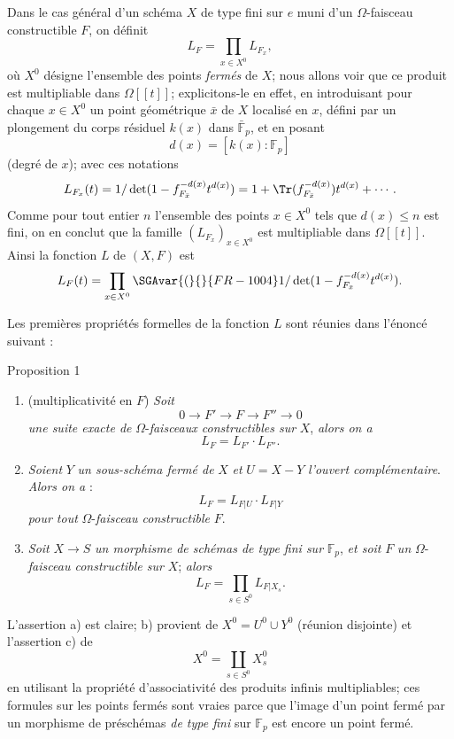 Dans le cas
général d'un schéma $X$ de type fini sur $e$ muni d'un $\Omega$-faisceau constructible $F$, on définit
\[
L_F=\prod_{x\in X^0}L_{F_x},
\]
où $X^0$ désigne l'ensemble des points \emph{fermés} de $X$; nous allons voir que ce produit est multipliable dans $\Omega[[t]]$; explicitons-le en effet, en introduisant pour chaque $x\in X^0$ un point géométrique $\bar x$ de $X$ localisé en $x$, défini par un plongement du corps résiduel $k(x)$ dans $\bar{\mathbb{F}}_p$, et en posant
\[
d(x)=[k(x):\mathbb{F}_p]
\]
(degré de $x$); avec ces notations
\[
L_{F_x}(t)=1/\det(1-f_{F_{\bar x}}^{-d(x)}t^{d(x)})
 =1+\Tr(f_{F_{\bar x}}^{-d(x)})t^{d(x)}+\cdots .
\]
Comme pour tout entier $n$ l'ensemble des points $x\in X^0$ tels que $d(x)\le n$ est fini, on en conclut que la famille $(L_{F_x})_{x\in X^0}$ est multipliable dans $\Omega[[t]]$. Ainsi la fonction $L$ de $(X,F)$ est
\[
L_F(t)=\prod_{x\in X^0}\SGAvar{(}{}{FR-1004}1/\det(1-f_{F_{\bar x}}^{-d(x)}t^{d(x)}).
\]

Les premières propriétés formelles de la fonction $L$ sont réunies dans l'énoncé suivant :

\begin{statement}{Proposition 1}
\begin{enumerate}[label=\alph*)]
\item (multiplicativité en $F$) \emph{Soit}
\[
0\longrightarrow F'\longrightarrow F\longrightarrow F''\longrightarrow0
\]
\emph{une
suite exacte de} $\Omega$-\emph{faisceaux constructibles sur} $X$, \emph{alors on a}
\[
L_F=L_{F'}\cdot L_{F''}.
\]
\item \emph{Soient} $Y$ \emph{un sous-schéma fermé de} $X$ \emph{et} $U=X-Y$ \emph{l'ouvert complémentaire}. \emph{Alors on a} :
\[
L_F=L_{F|U}\cdot L_{F|Y}
\]
\emph{pour tout} $\Omega$-\emph{faisceau constructible} $F$.
\item \emph{Soit} $X\to S$ \emph{un morphisme de schémas de type fini sur} $\mathbb{F}_p$, \emph{et soit} $F$ \emph{un} $\Omega$-\emph{faisceau constructible sur} $X$; \emph{alors}
\[
L_F=\prod_{s\in S^0}L_{F|X_s}.
\]
\end{enumerate}
\end{statement}

L'assertion a) est claire; b) provient de $X^0=U^0\cup Y^0$ (réunion disjointe) et l'assertion c) de
\[
X^0=\coprod_{s\in S^0}X_s^0
\]
en utilisant la propriété d'associativité des produits infinis multipliables; ces formules sur les points fermés sont vraies parce que l'image d'un point fermé par un morphisme de préschémas \emph{de type fini} sur $\mathbb{F}_p$ est encore un point fermé.

